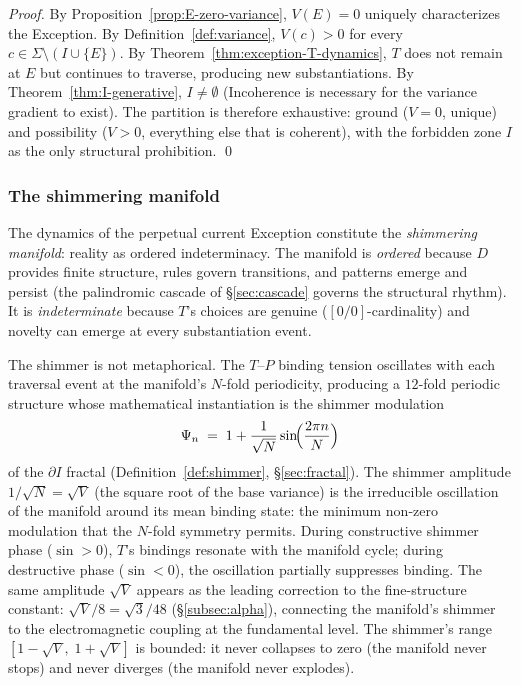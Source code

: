 \documentclass[11pt,a4paper]{article}
\theoremstyle{definition}
\theoremstyle{remark}
\begin{document}
\begin{proof}
By Proposition~\ref{prop:E-zero-variance}, $V(E) = 0$ uniquely characterizes the Exception. By Definition~\ref{def:variance}, $V(c) > 0$ for every $c \in \Sigma \setminus (I \cup \{E\})$. By Theorem~\ref{thm:exception-T-dynamics}, $T$ does not remain at $E$ but continues to traverse, producing new substantiations. By Theorem~\ref{thm:I-generative}, $I \neq \emptyset$ (Incoherence is necessary for the variance gradient to exist). The partition is therefore exhaustive: ground ($V = 0$, unique) and possibility ($V > 0$, everything else that is coherent), with the forbidden zone $I$ as the only structural prohibition. \qed
\end{proof}

\subsubsection{The shimmering manifold}\label{subsubsec:shimmer-manifold}

The dynamics of the perpetual current Exception constitute the \emph{shimmering manifold}: reality as ordered indeterminacy. The manifold is \emph{ordered} because $D$ provides finite structure, rules govern transitions, and patterns emerge and persist (the palindromic cascade of \S\ref{sec:cascade} governs the structural rhythm). It is \emph{indeterminate} because $T$'s choices are genuine ($[0/0]$-cardinality) and novelty can emerge at every substantiation event.

The shimmer is not metaphorical. The $T$--$P$ binding tension oscillates with each traversal event at the manifold's $N$-fold periodicity, producing a $12$-fold periodic structure whose mathematical instantiation is the shimmer modulation
\[
\Psi_{n} \;=\; 1 + \frac{1}{\sqrt{N}}\sin\!\Bigl(\frac{2\pi n}{N}\Bigr)
\]
of the $\partial I$ fractal (Definition~\ref{def:shimmer}, \S\ref{sec:fractal}). The shimmer amplitude $1/\sqrt{N} = \sqrt{V}$ (the square root of the base variance) is the irreducible oscillation of the manifold around its mean binding state: the minimum non-zero modulation that the $N$-fold symmetry permits. During constructive shimmer phase ($\sin > 0$), $T$'s bindings resonate with the manifold cycle; during destructive phase ($\sin < 0$), the oscillation partially suppresses binding. The same amplitude $\sqrt{V}$ appears as the leading correction to the fine-structure constant: $\sqrt{V}/8 = \sqrt{3}/48$ (\S\ref{subsec:alpha}), connecting the manifold's shimmer to the electromagnetic coupling at the fundamental level. The shimmer's range $[1 - \sqrt{V},\; 1 + \sqrt{V}]$ is bounded: it never collapses to zero (the manifold never stops) and never diverges (the manifold never explodes).
\end{document}
